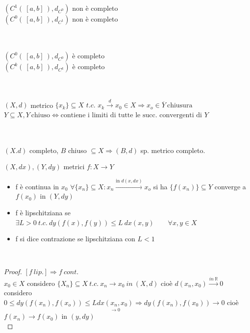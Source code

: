 \documentclass[a4paper, oneside]{article}
\begin{document}
    \hfil\\
    \\
    $(C^1 ( \ [a,b] \ ), d_{C^0})$ non è completo\\
    $(C^0 ( \ [a,b] \ ), d_{C^1})$ non è completo
    
    \hfil\\
    \\
    $(C^0 ( \ [a,b] \ ), d_{C^0})$ è completo\\
    $(C^k ( \ [a,b] \ ), d_{C^k})$ è completo

    \hfil\\
    \\
    $(X,d)$ metrico $\{x_k\} \subseteq X$ $t.c.$ $x_k \xrightarrow{d} x_0 \in X \Rightarrow x_o \in \overline{Y} \ \text{chiusura}$\\
    $Y \subseteq X, Y \ \text{chiuso} \Leftrightarrow \text{contiene i limiti di tutte le succ. convergenti di } Y$

    \hfil\\
    \\
    $(X.d)$ completo, $B$ chiuso $\subseteq X \Rightarrow (B,d)$ sp. metrico completo.

    \begin{definition}
        $(X, dx),(Y,dy)$ metrici $f:X \to Y$\\
        \begin{itemize}
            \item f è continua in $x_0$  $\forall \{x_n\} \subseteq X: x_n \xrightarrow{\text{in } d(x,dx)} x_o$ si ha $\{f(x_n)\} \subseteq Y$ converge a $f(x_0)$ in $(Y,dy)$
            \item f è lipschitziana se $\exists L>0 \ t.c. \ dy( f(x), f(y)) \leq L \ dx(x,y) \qquad \forall x,y \in X$
            \item f si dice contrazione se lipschitziana con $L<1$
        \end{itemize}
    \end{definition}

    \\
    \begin{proof}
        $[f \ lip.] \Rightarrow f \ cont.$\\
         $x_0 \in X$ considero $\{X_n\} \subseteq X \ t.c. \ x_n \to x_0 \ in \ (X,d)$ cioè $d(x_n, x_0) \xrightarrow{in \ \mathbb{R}} 0$\\
        considero $0 \leq dy ( f(x_n), f(x_o)) \leq L \underset{\to 0}{dx(x_n, x_0)} \Rightarrow dy ( f(x_n), f(x_0)) \to 0$ cioè $f(x_n) \to f(x_0)$ in $(y,dy)$\\
    \end{proof}
\end{document}
